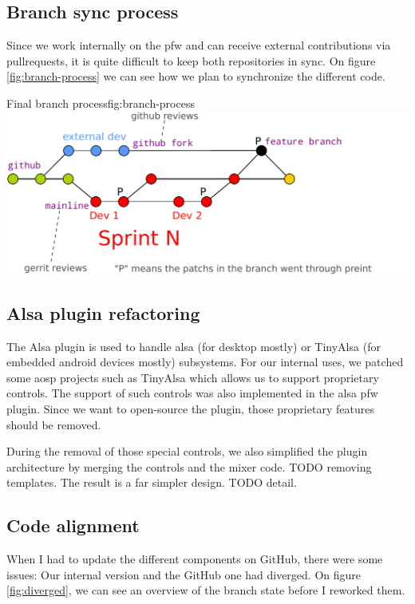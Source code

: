 \subsection{Branch sync process}\label{sec:syncProcess}
Since we work internally on the \gls{pfw} and can receive external contributions via \gls{pullrequests},
it is quite difficult to keep both repositories in sync.
On figure \ref{fig:branch-process} we can see how we plan to synchronize the different code.

\begin{figureGraphics}{Final branch process}{fig:branch-process}
    \includegraphics[width=\textwidth]{./src/img/branches-process.pdf}
\end{figureGraphics}


\subsection{Alsa plugin refactoring}
The Alsa plugin is used to handle \gls{alsa} (for desktop mostly) or TinyAlsa (for embedded \gls{android} devices mostly) subsystems.
For our internal uses, we patched some \gls{aosp} projects such as TinyAlsa which allows us to support proprietary controls.
The support of such controls was also implemented in the \gls{alsa} \gls{pfw} plugin. Since
we want to open-source the plugin, those proprietary features should be removed.

During the removal of those special controls, we also simplified the plugin
architecture by merging the controls and the mixer code. TODO removing templates.
The result is a far simpler design.
TODO detail.

\subsection{Code alignment}

When I had to update the different components on \gls{GitHub}, there were some issues:
Our internal version and the \gls{GitHub} one had diverged.
On figure \ref{fig:diverged}, we can see an overview of the branch state before I reworked them.

